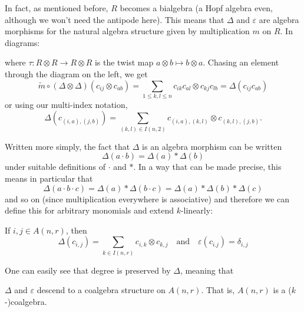 \documentclass[12pt]{article}
\begin{document}
In fact, as mentioned before, $R$ becomes a bialgebra (a Hopf algebra even, although we won't need the antipode here). This means that 
$\Delta$ and $\varepsilon$ are algebra morphisms for the natural algebra structure given by multiplication $m$ on $R$. In diagrams:
\begin{center}
	\quad{}
\end{center}
where $\tau:R\otimes R\to R\otimes R$ is the twist map $a\otimes b\mapsto b\otimes a$. 
Chasing an element through the diagram on the left, we get
\[\tilde m\circ (\Delta\otimes \Delta)(c_{ij}\otimes c_{ab})=\sum_{1\le k,l\le n}c_{ik}c_{al}\otimes c_{kj}c_{lb}=\Delta(c_{ij}{c_{ab}})\]
or using our multi-index notation,
\[\Delta(c_{(i,a),(j,b)})=\sum_{(k,l)\in I(n,2)}c_{(i,a),(k,l)}\otimes c_{(k,l),(j,b)}.\]

Written more simply, the fact that $\Delta$ is an algebra morphism can be written 
\[\Delta(a\cdot b)=\Delta(a)\ast\Delta(b)\]
under suitable definitions of $\cdot$ and $\ast$. In a way that can be made precise, this means in particular that 
\[\Delta(a\cdot b\cdot c)=\Delta(a)\ast\Delta(b\cdot c)=\Delta(a)\ast\Delta(b)\ast\Delta(c)\]
and so on (since multiplication everywhere is associative) and therefore we can define this for arbitrary monomials and extend $k$-linearly: 
\begin{prop}
	If $i,j\in A(n,r)$, then 
	\[\Delta(c_{i,j})=\sum_{k\in I(n,r)}c_{i,k}\otimes c_{k,j}\quad\text{and}\quad \varepsilon(c_{i.j})=\delta_{i,j}\]
\end{prop}
One can easily see that degree is preserved by $\Delta$, meaning that 
\begin{prop}
	$\Delta$ and $\varepsilon$ descend to a coalgebra structure on $A(n,r)$. That is, $A(n,r)$ is a ($k$-)coalgebra.
\end{prop}
\end{document}
